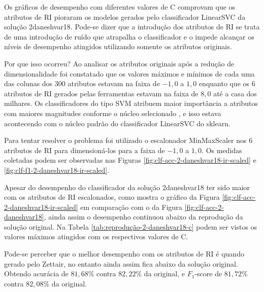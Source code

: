 			

			

			Os gráficos de desempenho com diferentes valores de C comprovam que os atributos de RI pioraram os modelos gerados pelo classificador LinearSVC da solução 2\underscore{}daneshvar18.
			Pode-se dizer que a introdução dos atributos de RI se trata de uma introdução de ruído que atrapalha o classificador e o impede alcançar os níveis de desempenho atingidos utilizando somente os atributos originais.

			Por que isso ocorreu?
			Ao analisar os atributos originais após a redução de dimensionalidade foi constatado que os valores máximos e mínimos de cada uma das colunas dos 300 atributos estavam na faixa de $-1,0$ a $1,0$ enquanto que os 6 atributos de RI gerados pelas ferramentas estavam na faixa de $8,0$ até a casa dos milhares.
			Os classificadores do tipo SVM atribuem maior importância a atributos com maiores magnitudes conforme o núcleo selecionado \cite{Kumar2014}, e isso estava acontecendo com o núcleo padrão do classificador LinearSVC do sklearn.

			Para tentar resolver o problema foi utilizado o escalonador MinMaxScaler nos 6 atributos de RI para dimensioná-los para a faixa de $-1,0$ a $1,0$. 
			Os medidas coletadas podem ser observadas nas Figuras \ref{fig:clf-acc-2-daneshvar18-ir-scaled} e \ref{fig:clf-f1-2-daneshvar18-ir-scaled}. 

			

			

			Apesar do desempenho do classificador da solução 2\underscore{}daneshvar18 ter sido maior com os atributos de RI escalonados, como mostra o gráfico da Figura \ref{fig:clf-acc-2-daneshvar18-ir-scaled} em comparação com o da Figura \ref{fig:clf-acc-2-daneshvar18}, ainda assim o desempenho continuou abaixo da reprodução da solução original.
			Na Tabela \ref{tab:reprodução-2-daneshvar18-c} podem ser vistos os valores máximos atingidos com os respectivos valores de C.

			

			Pode-se perceber que o melhor desempenho com os atributos de RI é quando gerado pelo Zettair, no entanto ainda assim fica abaixo da solução original.
			Obtendo acurácia de $81,68\%$ contra $82,22\%$ da original, e $F_1$-score de $81,72\%$ contra $82,08\%$ da original.




